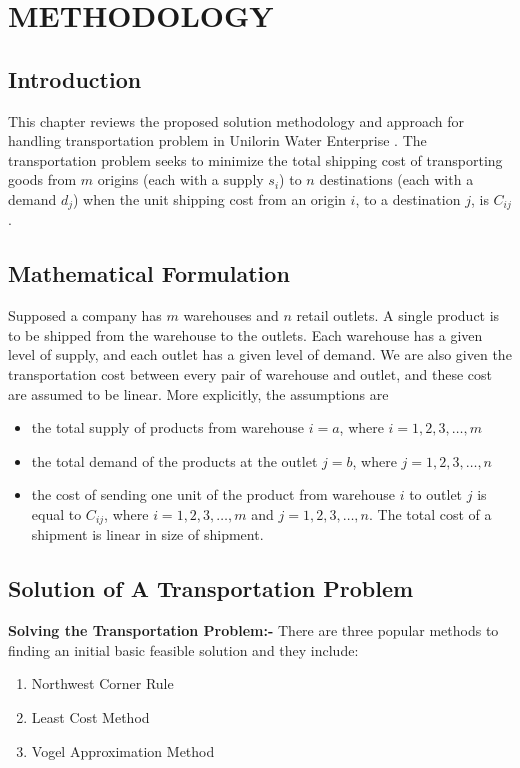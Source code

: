 \documentclass[12pt]{report}
\newcommand{\bt}[1]{\textbf{#1}}
\newcommand{\NI}{\noindent}
\newcommand{\tp}{Transportation Problem }
\newcommand{\stp}{transportation problem }
\newcommand{\uwe}{Unilorin Water Enterprise }
\begin{document}
	\chapter{METHODOLOGY}
	
	\section{Introduction}
	This chapter reviews the proposed solution methodology and approach for handling transportation problem in \uwe. The \stp seeks to minimize the total shipping cost of transporting goods from  $m$ origins (each with a supply $s_i$) to $n$ destinations (each with a demand $d_j$) when the unit shipping cost from an origin $i$, to a destination $j$, is $C_{ij}$.
	
	\section{Mathematical Formulation}
	Supposed a company has $m$ warehouses and $n$ retail outlets. A single product is to be shipped from the warehouse to the outlets. Each warehouse has a given level of supply, and each outlet has a given level of demand. We are also given the transportation cost between every pair of warehouse and outlet, and these cost are assumed to be linear. More explicitly, the assumptions are
	\begin{itemize}
		\item the total supply of products from warehouse $i=a$, where $i=1,2,3,\ldots, m$
		\item the total demand of the products at the outlet $j=b$, where $j=1,2,3,\ldots, n$
		\item the cost of sending one unit of the product from warehouse $i$ to outlet $j$ is equal to $C_{ij}$, where $i=1,2,3,\ldots,m$ and $j=1,2,3,\ldots,n$. The total cost of a shipment is linear in size of shipment.
	\end{itemize}

	\section{Solution of A \tp}
	\NI \bt{Solving the Transportation Problem:-} There are three popular methods to finding an initial basic feasible solution and they include:
	\begin{enumerate}
		\renewcommand{\labelenumi}{(\arabic{enumi})}
		\item Northwest Corner Rule
		\item Least Cost Method
		\item Vogel Approximation Method
	\end{enumerate}
	
\end{document}
